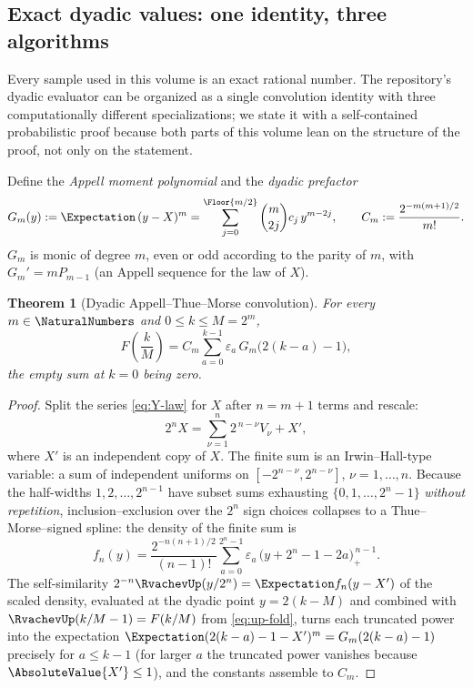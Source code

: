 \documentclass[11pt,oneside]{article}
\numberwithin{equation}{section}
\newtheorem{theorem}{Theorem}[section]
\theoremstyle{definition}
\theoremstyle{remark}
\newcommand{\eps}{\varepsilon}
\begin{document}
\subsection{Exact dyadic values: one identity, three algorithms}
\label{sec:dyadic-values}

Every sample used in this volume is an exact rational number.  The
repository's dyadic evaluator can be organized as a single convolution
identity with three computationally different specializations; we state
it with a self-contained probabilistic proof because both parts of this
volume lean on the structure of the proof, not only on the statement.

Define the \emph{Appell moment polynomial} and the \emph{dyadic
prefactor}
\begin{equation}
 G_m(y):=\Expectation\,(y-X)^m
 =\sum_{j=0}^{\Floor{m/2}}\binom m{2j}c_j\,y^{m-2j},
 \qquad
 C_m:=\frac{2^{-m(m+1)/2}}{m!}.
 \label{eq:Pm-Cm}
\end{equation}
$G_m$ is monic of degree $m$, even or odd according to the parity of
$m$, with $G_m'=mP_{m-1}$ (an Appell sequence for the law of $X$).

\begin{theorem}[Dyadic Appell--Thue--Morse convolution]
\label{thm:dyadic-values}
For every $m\in\NaturalNumbers$ and $0\le k\le M=2^m$,
\begin{equation}
 \boxed{\;
 F\!\left(\frac{k}{M}\right)
 =C_m\sum_{a=0}^{k-1}\eps_a\,G_m\bigl(2(k-a)-1\bigr),
 \;}
 \label{eq:dyadic-convolution}
\end{equation}
the empty sum at $k=0$ being zero.
\end{theorem}

\begin{proof}
Split the series \eqref{eq:Y-law} for $X$ after $n=m+1$ terms and
rescale:
\[
 2^{n}X=\sum_{\nu=1}^{n}2^{\,n-\nu}V_\nu+X',
\]
where $X'$ is an independent copy of $X$.  The finite sum is an
Irwin--Hall-type variable: a sum of independent uniforms on
$[-2^{n-\nu},2^{n-\nu}]$, $\nu=1,\dots,n$.  Because the half-widths
$1,2,\dots,2^{n-1}$ have subset sums exhausting
$\{0,1,\dots,2^{n}-1\}$ \emph{without repetition}, inclusion--exclusion
over the $2^n$ sign choices collapses to a Thue--Morse--signed spline:
the density of the finite sum is
\[
 f_n(y)=\frac{2^{-n(n+1)/2}}{(n-1)!}
 \sum_{a=0}^{2^{n}-1}\eps_a\,
 \bigl(y+2^{n}-1-2a\bigr)_+^{\,n-1}.
\]
The self-similarity $2^{-n}\RvachevUp(y/2^{n})=\Expectation f_n(y-X')$ of the scaled
density, evaluated at the dyadic point $y=2(k-M)$ and combined with
$\RvachevUp(k/M-1)=F(k/M)$ from \eqref{eq:up-fold}, turns each truncated power
into the expectation $\Expectation(2(k-a)-1-X')^{m}=G_m(2(k-a)-1)$ precisely for
$a\le k-1$ (for larger $a$ the truncated power vanishes because
$\AbsoluteValue{X'}\le1$), and the constants assemble to $C_m$.
\end{proof}
\end{document}
